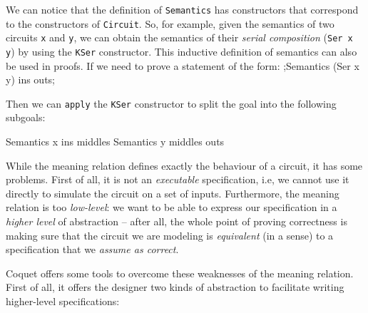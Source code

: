             We can notice that the definition of \texttt{Semantics} has constructors that correspond
            to the constructors of \texttt{Circuit}. So, for example, given the semantics of two
            circuits \texttt{x} and \texttt{y}, we can obtain the semantics of their \emph{serial
                composition} (\texttt{Ser x y}) by using the \texttt{KSer} constructor. This
            inductive definition of semantics can also be used in proofs. If we need to prove a
            statement of the form: \coq;Semantics (Ser x y) ins outs;

            Then we can \texttt{apply} the \texttt{KSer} constructor to split the goal into the
            following subgoals:

            \begin{coqcode}
        Semantics x ins middles
        Semantics y middles outs
            \end{coqcode}

            While the meaning relation defines exactly the behaviour of a circuit, it has some
            problems. First of all, it is not an \emph{executable} specification, i.e, we cannot use
            it directly to simulate the circuit on a set of inputs. Furthermore, the meaning
            relation is too \emph{low-level}: we want to be able to express our specification in a
            \emph{higher level} of abstraction -- after all, the whole point of proving correctness
            is making sure that the circuit we are modeling is \emph{equivalent} (in a sense) to a
            specification that we \emph{assume as correct}.

            Coquet offers some tools to overcome these weaknesses of the meaning relation. First of
            all, it offers the designer two kinds of abstraction to facilitate writing higher-level
            specifications:


